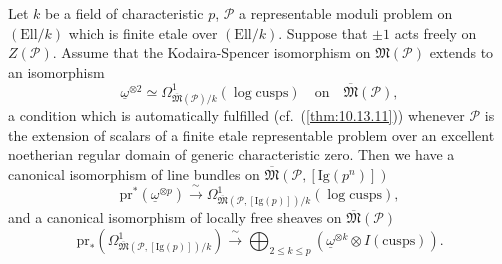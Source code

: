 \begin{kthm}\label{thm:12.8.7}
Let $k$ be a field of characteristic $p$, $\mathcal{P}$ a representable moduli problem on $(\mathrm{Ell}/k)$ which is finite etale over $(\mathrm{Ell}/k)$. Suppose that $\pm 1$ acts freely on $Z(\mathcal{P})$. Assume that the Kodaira-Spencer isomorphism on $\mathfrak{M}(\mathcal{P})$ extends to an isomorphism
\[
\underline{\omega}^{\otimes 2} \simeq \Omega^1_{\overline{\mathfrak{M}}(\mathcal{P})/k}(\log\mathrm{cusps}) \quad\text{on}\quad \overline{\mathfrak{M}}(\mathcal{P}) ,
\]
a condition which is automatically fulfilled (cf.~(\ref{thm:10.13.11})) whenever $\mathcal{P}$ is the extension of scalars of a finite etale representable problem over an excellent noetherian regular domain of generic characteristic zero. Then we have a canonical isomorphism of line bundles on $\overline{\mathfrak{M}}(\mathcal{P}, [\mathrm{Ig}(p^n)])$
\[
\mathrm{pr}^*(\underline{\omega}^{\otimes p}) \xrightarrow{\ \sim\ } \Omega^1_{\overline{\mathfrak{M}}(\mathcal{P}, [\mathrm{Ig}(p)])/k}(\log\mathrm{cusps}) ,
\]
and a canonical isomorphism of locally free sheaves on $\overline{\mathfrak{M}}(\mathcal{P})$
\[
\mathrm{pr}_*(\Omega^1_{\overline{\mathfrak{M}}(\mathcal{P}, [\mathrm{Ig}(p)])/k}) \xrightarrow{\ \sim\ } \bigoplus_{2 \le k \le p} (\underline{\omega}^{\otimes k} \otimes I(\mathrm{cusps})) .
\]
\end{kthm}

